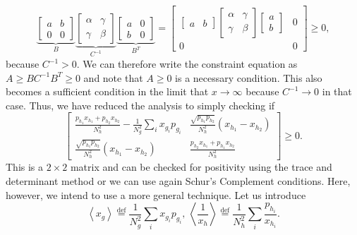 \documentclass{article}
\begin{document}
\begin{displaymath}
\underbrace{\left[\begin{array}{cc}
	a & b\\
	0 & 0
	\end{array}\right]}_{B}\underbrace{\left[\begin{array}{cc}
	\alpha & \gamma\\
	\gamma & \beta
	\end{array}\right]}_{C^{-1}}\underbrace{\left[\begin{array}{cc}
	a & 0\\
	b & 0
	\end{array}\right]}_{B^{T}}=\left[\begin{array}{cc}
\left[\begin{array}{cc}
a & b\end{array}\right]\left[\begin{array}{cc}
\alpha & \gamma\\
\gamma & \beta
\end{array}\right]\left[\begin{array}{c}
a\\
b
\end{array}\right] & 0\\
0 & 0
\end{array}\right]\ge0,
\end{displaymath}
because $C^{-1}>0$. We can therefore write the constraint equation
as
$
A\ge BC^{-1}B^{T}\ge0
$
and note that $A\ge0$ is a necessary condition. This also becomes
a sufficient condition in the limit that $x\to\infty$ because $C^{-1}\to0$
in that case. Thus, we have reduced the analysis to simply checking
if 
\begin{displaymath}
\left[\begin{array}{cc}
\frac{p_{h_{1}}x_{h_{1}}+p_{h_{2}}x_{h_{2}}}{N_{h}^{2}}-\frac{1}{N_{g}^{2}}\sum_{i}x_{g_{i}}p_{g_{i}} & \frac{\sqrt{p_{h_{1}}p_{h_{2}}}}{N_{h}^{2}}(x_{h_{1}}-x_{h_{2}})\\
\frac{\sqrt{p_{h_{1}}p_{h_{2}}}}{N_{h}^{2}}(x_{h_{1}}-x_{h_{2}}) & \frac{p_{h_{2}}x_{h_{1}}+p_{h_{1}}x_{h_{2}}}{N_{h}^{2}}
\end{array}\right]\ge0.
\end{displaymath}
This is a $2\times2$ matrix and can be checked for positivity using the
trace and determinant method or we can use again Schur's
Complement conditions. Here, however, we intend to use a more
general technique.
Let us introduce 
\begin{displaymath}
\left\langle x_{g}\right\rangle \overset{\text{def}}{=}\frac{1}{N_{g}^{2}}\sum_{i}x_{g_{i}}p_{g_{i}},\,\left\langle \frac{1}{x_{h}}\right\rangle \overset{\text{def}}{=}\frac{1}{N_{h}^{2}}\sum_{i}\frac{p_{h_{i}}}{x_{h_{i}}}.
\end{displaymath}
\end{document}
